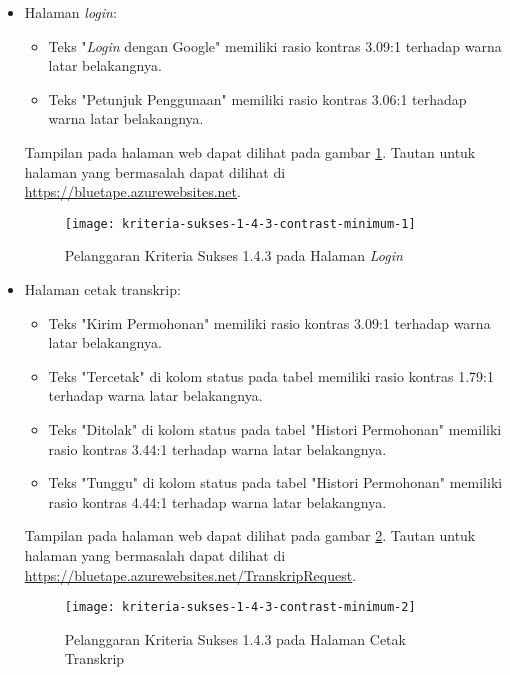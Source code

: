 \begin{itemize}
    \item Halaman \textit{login}: 
    \begin{itemize}
        \item Teks "\textit{Login} dengan Google" memiliki rasio kontras 3.09:1 terhadap warna latar belakangnya.
        \item Teks "Petunjuk Penggunaan" memiliki rasio kontras 3.06:1 terhadap warna latar belakangnya.
    \end{itemize}
    Tampilan pada halaman web dapat dilihat pada gambar \ref{fig:1.4.3_contrast_minimum_1}. Tautan untuk halaman yang bermasalah dapat dilihat di \url{https://bluetape.azurewebsites.net}.
    \begin{figure}[H]
        \centering  
        \texttt{[image: kriteria-sukses-1-4-3-contrast-minimum-1]}  
        \caption[Pelanggaran Kriteria Sukses 1.4.3 pada Halaman \textit{Login}]{Pelanggaran Kriteria Sukses 1.4.3 pada Halaman \textit{Login}}
        \label{fig:1.4.3_contrast_minimum_1}  
    \end{figure} 
    
    \item Halaman cetak transkrip: 
    \begin{itemize}
        \item Teks "Kirim Permohonan" memiliki rasio kontras 3.09:1 terhadap warna latar belakangnya.
        \item Teks "Tercetak" di kolom status pada tabel memiliki rasio kontras 1.79:1 terhadap warna latar belakangnya.
        \item Teks "Ditolak" di kolom status pada tabel "Histori Permohonan" memiliki rasio kontras 3.44:1 terhadap warna latar belakangnya.
        \item Teks "Tunggu" di kolom status pada tabel "Histori Permohonan" memiliki rasio kontras 4.44:1 terhadap warna latar belakangnya.
    \end{itemize}   
    Tampilan pada halaman web dapat dilihat pada gambar \ref{fig:1.4.3_contrast_minimum_2}. Tautan untuk halaman yang bermasalah dapat dilihat di \url{https://bluetape.azurewebsites.net/TranskripRequest}.
    \begin{figure}[H]
        \centering  
        \texttt{[image: kriteria-sukses-1-4-3-contrast-minimum-2]}  
        \caption[Pelanggaran Kriteria Sukses 1.4.3 pada Halaman Cetak Transkrip]{Pelanggaran Kriteria Sukses 1.4.3 pada Halaman Cetak Transkrip}
        \label{fig:1.4.3_contrast_minimum_2}  
    \end{figure} 
    

\end{itemize}
